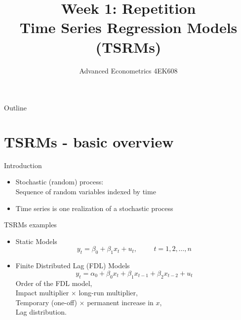 \documentclass{beamer}
\title[Week1]{Week 1:  Repetition \\ Time Series Regression Models (TSRMs)}
\author{Advanced Econometrics 4EK608}
\institute{Vysoká škola ekonomická v Praze}
\date{}
\begin{document}
 
\begin{frame}
  \titlepage
\end{frame}

\begin{frame}{Outline}
  \tableofcontents
\end{frame}

\section{TSRMs - basic overview}

\begin{frame}{Introduction}

\begin{itemize}
  \item Stochastic (random) process: \\ 
  Sequence of random variables indexed by time
  \vskip 1cm
  \item Time series is one realization of a stochastic process
\end{itemize}

\end{frame}


\begin{frame}{TSRMs examples}

\begin{itemize}
  \item Static Models
  $$ y_t = \beta_0 + \beta_1 x_t + u_t , \hspace{1cm} t = 1, 2,  \dots, n $$
  \item Finite Distributed Lag (FDL) Models
  $$ y_t = \alpha_0 + \beta_0 x_t + \beta_1 x_{t-1} + \beta_2 x_{t-2} + u_t $$
  Order of the FDL model, \\
  Impact multiplier $\times$ long-run multiplier, \\
  Temporary (one-off) $\times$ permanent increase in $x$, \\
  Lag distribution. 
\end{itemize}

\end{frame}

\end{document}
